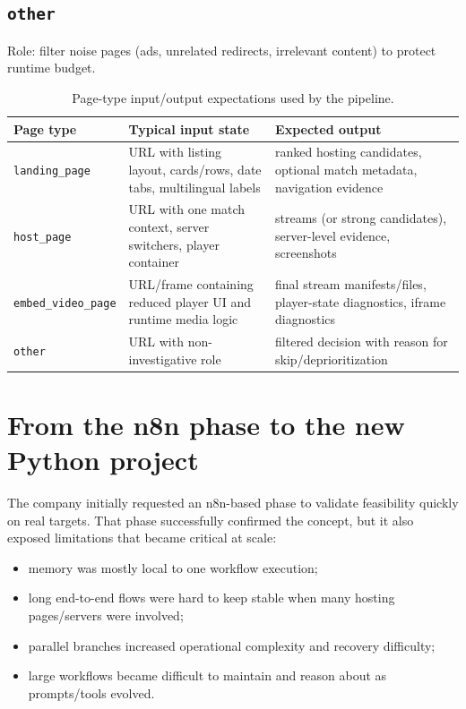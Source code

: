 \subsection{\texttt{other}}

Role: filter noise pages (ads, unrelated redirects, irrelevant content) to protect
runtime budget.

\begin{table}[H]
\centering
\begin{tabularx}{\textwidth}{>{\raggedright\arraybackslash}p{4.5cm}
                              >{\raggedright\arraybackslash}X
                              >{\raggedright\arraybackslash}X}
\toprule
\rowcolor{accent!8}
Page type & Typical input state & Expected output \\
\midrule
\texttt{landing\_page} & URL with listing layout, cards/rows, date tabs, multilingual
  labels & ranked hosting candidates, optional match metadata, navigation evidence \\
\texttt{host\_page} & URL with one match context, server switchers, player container &
  streams (or strong candidates), server-level evidence, screenshots \\
\texttt{embed\_video\_page} & URL/frame containing reduced player UI and runtime media
  logic & final stream manifests/files, player-state diagnostics, iframe diagnostics \\
\texttt{other} & URL with non-investigative role & filtered decision with reason for
  skip/deprioritization \\
\bottomrule
\end{tabularx}
\caption{Page-type input/output expectations used by the pipeline.}
\label{tab:page-types-io}
\end{table}

\section{From the n8n phase to the new Python project}

The company initially requested an n8n-based phase to validate feasibility quickly on
real targets. That phase successfully confirmed the concept, but it also exposed
limitations that became critical at scale:

\begin{itemize}
  \item memory was mostly local to one workflow execution;
  \item long end-to-end flows were hard to keep stable when many hosting pages/servers
    were involved;
  \item parallel branches increased operational complexity and recovery difficulty;
  \item large workflows became difficult to maintain and reason about as prompts/tools
    evolved.
\end{itemize}


